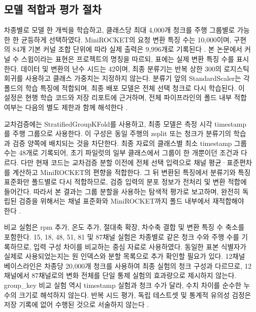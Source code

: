 \documentclass[11pt,a4paper]{article}
\newcommand{\sourceproject}{\citep{project2026}}
\begin{document}
\subsection{모델 적합과 평가 절차}
차종별로 모델 한 개씩을 학습하고, 클래스당 최대 4,000개 청크를 주행 그룹별로 가능한 한 균등하게 선택하였다.
MiniROCKET의 요청 변환 특징 수는 10,000이며, 구현의 84개 기본 커널 조합 단위에 따라 실제 출력은 9,996개로 기록된다 \citep{sktime2026}.
본 논문에서 커널 수 스윕이라는 표현은 프로젝트의 명칭을 따르되, 표에는 실제 변환 특징 수를 표시한다.
데이터 및 변환의 난수 시드는 42이며, 최종 분류기는 반복 상한 300의 로지스틱 회귀를 사용하고 클래스 가중치는 지정하지 않는다.
분류기 앞의 StandardScaler는 각 폴드의 학습 특징에 적합되며, 최종 배포 모델은 전체 선택 청크로 다시 학습된다.
이 설정은 현행 학습 코드와 저장 리포트에 근거하며, 전체 파이프라인의 폴드 내부 적합 여부는 다음의 별도 제한과 함께 해석한다 \sourceproject.

교차검증에는 StratifiedGroupKFold를 사용하고, 최종 모델은 측정 시각 timestamp를 주행 그룹으로 사용한다.
이 구성은 동일 주행의 zsplit 또는 청크가 분류기의 학습과 검증 양쪽에 배치되는 것을 차단한다.
최종 자료의 클래스별 최소 timestamp 그룹 수는 48개로 기록되어, 초기 파일럿의 일부 클래스에서 그룹이 한 개뿐이던 조건과 다르다.
다만 현재 코드는 교차검증 분할 이전에 전체 선택 입력으로 채널 평균·표준편차를 계산하고 MiniROCKET의 편향을 적합한다.
그 뒤 변환된 특징에서 분류기와 특징 표준화만 폴드별로 다시 적합하므로, 검증 입력의 분포 정보가 전처리 및 변환 적합에 들어간다.
따라서 본 결과는 그룹 분할을 사용하는 탐색적 평가로 보고하며, 완전히 독립된 검증을 위해서는 채널 표준화와 MiniROCKET까지 폴드 내부에서 재적합해야 한다 \citep{sklearn2026}.

비교 실험은 rpm 추가, 온도 추가, 절대축 확장, 차수축 결합 및 변환 특징 수 축소를 포함한다.
15, 18, 48, 51, 81 및 87채널 실험은 차종별로 같은 청크 수와 주행 수를 기록하므로, 입력 구성 차이를 비교하는 중심 자료로 사용하였다.
동일한 표본 식별자가 실제로 사용되었는지는 원 인덱스와 분할 목록으로 추가 확인할 필요가 있다.
12채널 베이스라인은 차종당 20,000개 청크를 사용하여 최종 실험의 청크 구성과 다르므로, 12채널에서 87채널로의 변화 전체를 단일 통제 실험의 효과량으로 제시하지 않는다.
group\_key 비교 실험 역시 timestamp 실험과 청크 수가 달라, 수치 차이를 순수한 누수의 크기로 해석하지 않는다.
반복 시드 평가, 독립 테스트셋 및 통계적 유의성 검정은 저장 기록에 없어 수행된 것으로 서술하지 않는다 \sourceproject.
\end{document}
